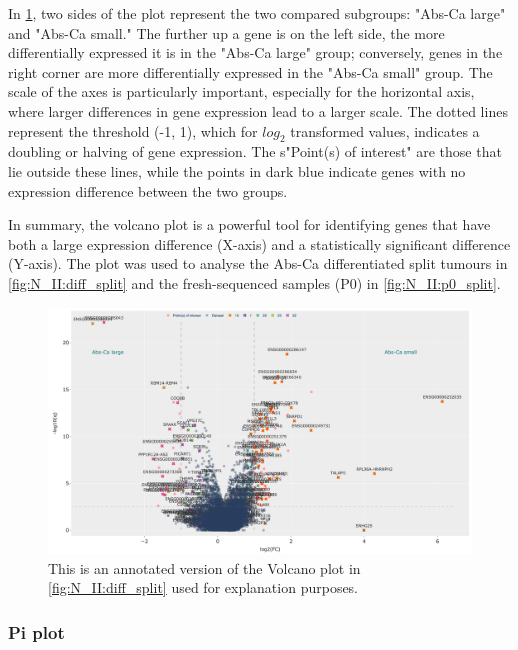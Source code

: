 In \cref{fig:lit:dea_eg}, two sides of the plot represent the two compared subgroups: "Abs-Ca large" and "Abs-Ca small." The further up a gene is on the left side, the more differentially expressed it is in the "Abs-Ca large" group; conversely, genes in the right corner are more differentially expressed in the "Abs-Ca small" group. The scale of the axes is particularly important, especially for the horizontal axis, where larger differences in gene expression lead to a larger scale. The dotted lines represent the threshold (-1, 1), which for $log_{2}$ transformed values, indicates a doubling or halving of gene expression. The s"Point(s) of interest" are those that lie outside these lines, while the points in dark blue indicate genes with no expression difference between the two groups.

In summary, the volcano plot is a powerful tool for identifying genes that have both a large expression difference (X-axis) and a statistically significant difference (Y-axis). The plot was used to analyse the Abs-Ca differentiated split tumours in \cref{fig:N_II:diff_split} and the fresh-sequenced samples (P0) in \cref{fig:N_II:p0_split}.

\begin{figure}[H] 
    \centering
    \includegraphics[width=1.0\textwidth,height=1.0\textheight,keepaspectratio]{Sections/Network_II/resources/non_tum/diff_split_dea.png}
    \caption{This is an annotated version of the Volcano plot in \cref{fig:N_II:diff_split} used for explanation purposes.}
    \label{fig:lit:dea_eg}
\end{figure}



\subsubsection{Pi plot} \label{s:lit:pi}

